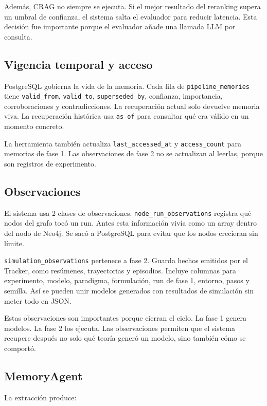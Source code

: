 Además, CRAG no siempre se ejecuta. Si el mejor resultado del reranking supera
un umbral de confianza, el sistema salta el evaluador para reducir latencia.
Esta decisión fue importante porque el evaluador añade una llamada LLM por
consulta.

\subsection{Vigencia temporal y acceso}

PostgreSQL gobierna la vida de la memoria. Cada fila de
\texttt{pipeline\_memories} tiene \texttt{valid\_from}, \texttt{valid\_to},
\texttt{superseded\_by}, confianza, importancia, corroboraciones y
contradicciones. La recuperación actual solo devuelve memoria viva. La
recuperación histórica usa \texttt{as\_of} para consultar qué era válido en un
momento concreto.

La herramienta también actualiza \texttt{last\_accessed\_at} y
\texttt{access\_count} para memorias de fase 1. Las observaciones de fase 2 no
se actualizan al leerlas, porque son registros de experimento.

\subsection{Observaciones}

El sistema usa 2 clases de observaciones. \texttt{node\_run\_observations}
registra qué nodos del grafo tocó un run. Antes esta información vivía como un
array dentro del nodo de Neo4j. Se sacó a PostgreSQL para evitar que los nodos
crecieran sin límite.

\texttt{simulation\_observations} pertenece a fase 2. Guarda hechos emitidos
por el Tracker, como resúmenes, trayectorias y episodios. Incluye columnas para
experimento, modelo, paradigma, formulación, run de fase 1, entorno, pasos y
semilla. Así se pueden unir modelos generados con resultados de simulación sin
meter todo en JSON.

Estas observaciones son importantes porque cierran el ciclo. La fase 1 genera
modelos. La fase 2 los ejecuta. Las observaciones permiten que el sistema
recupere después no solo qué teoría generó un modelo, sino también cómo se
comportó.

\subsection{MemoryAgent}

La extracción produce:

